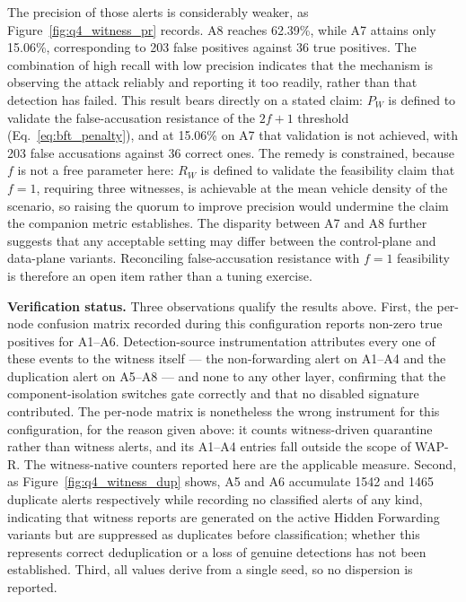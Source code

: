 \documentclass[12pt, a4paper]{report}
\begin{document}
{{The precision of those alerts is considerably weaker, as
Figure~\ref{fig:q4_witness_pr} records. A8 reaches 62.39\%,
while A7 attains only 15.06\%, corresponding to 203 false
positives against 36 true positives. The combination of high
recall with low precision indicates that the mechanism is
observing the attack reliably and reporting it too readily,
rather than that detection has failed. This result bears
directly on a stated claim: $P_W$ is defined to validate the
false-accusation resistance of the $2f{+}1$ threshold
(Eq.~\ref{eq:bft_penalty}), and at 15.06\% on A7 that
validation is not achieved, with 203 false accusations against
36 correct ones. The remedy is constrained, because $f$ is not
a free parameter here: $R_W$ is defined to validate the
feasibility claim that $f{=}1$, requiring three witnesses, is
achievable at the mean vehicle density of the scenario, so
raising the quorum to improve precision would undermine the
claim the companion metric establishes. The disparity between
A7 and A8 further suggests that any acceptable setting may
differ between the control-plane and data-plane variants.
Reconciling false-accusation resistance with $f{=}1$
feasibility is therefore an open item rather than a tuning
exercise.

\textbf{Verification status.} Three observations qualify the
results above. First, the per-node confusion matrix recorded
during this configuration reports non-zero true positives for
A1--A6. Detection-source instrumentation attributes every one of
these events to the witness itself --- the non-forwarding alert
on A1--A4 and the duplication alert on A5--A8 --- and none to
any other layer, confirming that the component-isolation
switches gate correctly and that no disabled signature
contributed. The per-node matrix is nonetheless the wrong
instrument for this configuration, for the reason given above:
it counts witness-driven quarantine rather than witness alerts,
and its A1--A4 entries fall outside the scope of WAP-R.
The witness-native counters reported here are the applicable
measure. Second, as
Figure~\ref{fig:q4_witness_dup} shows, A5 and A6 accumulate 1542
and 1465 duplicate alerts respectively while recording no
classified alerts of any kind, indicating that witness reports
are generated on the active Hidden Forwarding variants but are
suppressed as duplicates before classification; whether this
represents correct deduplication or a loss of genuine detections
has not been established. Third, all values derive from a single
seed, so no dispersion is reported.

}}
\end{document}
